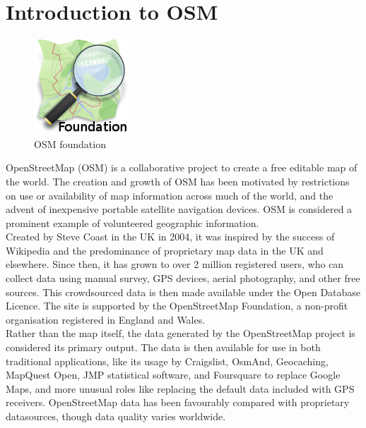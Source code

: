
\section{ Introduction to OSM}
\begin{figure}[ht]
	\centering \includegraphics[scale=.50]{input/images/osm-logo.png}
	\caption{OSM foundation}
\end{figure}

  OpenStreetMap (OSM) is a collaborative project to create a free editable map of the world. The creation and growth of OSM has been motivated by restrictions on use or availability of map information across much of the world, and the advent of inexpensive portable satellite navigation devices. OSM is considered a prominent example of volunteered geographic information.\\

Created by Steve Coast in the UK in 2004, it was inspired by the success of Wikipedia and the predominance of proprietary map data in the UK and elsewhere. Since then, it has grown to over 2 million registered users, who can collect data using manual survey, GPS devices, aerial photography, and other free sources. This crowdsourced data is then made available under the Open Database Licence. The site is supported by the OpenStreetMap Foundation, a non-profit organisation registered in England and Wales.\\

Rather than the map itself, the data generated by the OpenStreetMap project is considered its primary output. The data is then available for use in both traditional applications, like its usage by Craigslist, OsmAnd, Geocaching, MapQuest Open, JMP statistical software, and Foursquare to replace Google Maps, and more unusual roles like replacing the default data included with GPS receivers. OpenStreetMap data has been favourably compared with proprietary datasources, though data quality varies worldwide.\\
 
